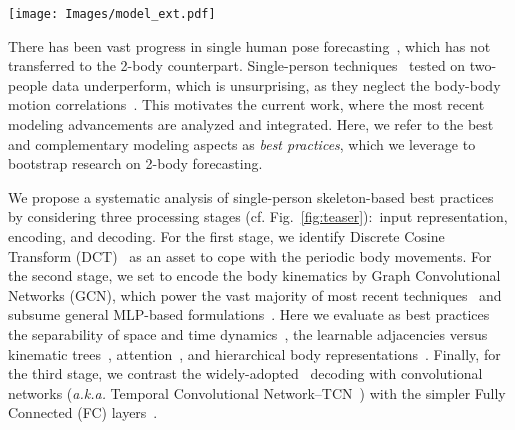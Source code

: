 \documentclass[10pt,twocolumn,letterpaper]{article}
\begin{document}
\begin{figure*}[t]
    \centering
    \texttt{[image: Images/model\_ext.pdf]}
    \caption{
    The general architecture of a 2-body pose forecasting model employing best practices.
    First, 3D joint coordinates are mapped to frequencies by DCT coefficients, a best input representation practice.
    Secondly, body kinematics are encoded by layers of a GCN , with separable space-time adjacency matrices , learned unconstrainedly, upon our proposed parameter initialization.
    Thirdly, the FC-based decoder outputs future poses for the two people, mapped to 3D coordinates with inverse-DCT (IDCT).}
    \label{fig:teaser}
\end{figure*}

There has been vast progress in single human pose forecasting~\cite{Dang21, Ma22, guo2022back}, which has not transferred to the 2-body counterpart.
Single-person techniques~\cite{benzine19, Dabral19, corona21} tested on two-people data underperform, which is unsurprising, as they neglect the body-body motion correlations~\cite{guo21}.
This motivates the current work, where the most recent modeling advancements are analyzed and integrated.
Here, we refer to the best and complementary modeling aspects as \emph{best practices}, which we leverage to bootstrap research on 2-body forecasting.

We propose a systematic analysis of single-person skeleton-based best practices by considering three processing stages (cf. Fig.~\ref{fig:teaser}): input representation, encoding, and decoding.
For the first stage, we identify Discrete Cosine Transform (DCT)~\cite{cai20, guo21, mao20his, mao19ltd, mao21multi} as an asset to cope with the periodic body movements.
For the second stage, we set to encode the body kinematics by Graph Convolutional Networks (GCN), which power the vast majority of most recent techniques~\cite{mao19ltd, mao20his, mao21multi, guo21, sofianos21, guo2022back} and subsume general MLP-based formulations~\cite{guo2022back}.
Here we evaluate as best practices the separability of space and time dynamics~\cite{sofianos21}, the learnable adjacencies versus kinematic trees~\cite{yan18}, attention~\cite{guo21}, and hierarchical body representations~\cite{Dang21}. 
Finally, for the third stage, we contrast the widely-adopted~\cite{sofianos21, Ma22, sampieri22} decoding with convolutional networks (\textit{a.k.a.} Temporal Convolutional Network--TCN~\cite{bai2018empirical}) with the simpler Fully Connected (FC) layers~\cite{guo2022back}.
\end{document}
